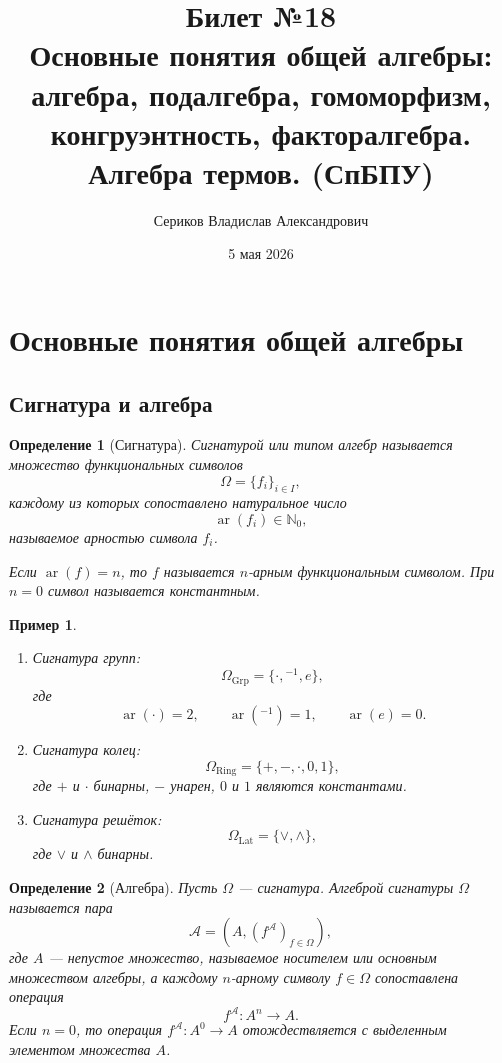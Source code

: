 \documentclass[12pt,a4paper]{article}
\title{Билет №18 \\ \small Основные понятия общей алгебры: алгебра, подалгебра, гомоморфизм, конгруэнтность, факторалгебра. Алгебра термов. (СпБПУ)}
\author{Сериков Владислав Александрович}
\date{5 мая 2026}
\newtheorem{definition}{Определение}
\newtheorem{example}{Пример}
\begin{document}
\maketitle
\tableofcontents
\newpage

\section{Основные понятия общей алгебры}

\subsection{Сигнатура и алгебра}

\begin{definition}[Сигнатура]
\emph{Сигнатурой} или \emph{типом алгебр} называется множество функциональных символов
\[
\Omega=\{f_i\}_{i\in I},
\]
каждому из которых сопоставлено натуральное число
\[
\operatorname{ar}(f_i)\in \mathbb N_0,
\]
называемое \emph{арностью} символа $f_i$.

Если $\operatorname{ar}(f)=n$, то $f$ называется $n$-арным функциональным символом.
При $n=0$ символ называется \emph{константным}.
\end{definition}

\begin{example}
\begin{enumerate}
    \item Сигнатура групп:
    \[
    \Omega_{\mathrm{Grp}}=\{\cdot,{}^{-1},e\},
    \]
    где
    \[
    \operatorname{ar}(\cdot)=2,\qquad
    \operatorname{ar}({}^{-1})=1,\qquad
    \operatorname{ar}(e)=0.
    \]

    \item Сигнатура колец:
    \[
    \Omega_{\mathrm{Ring}}=\{+,-,\cdot,0,1\},
    \]
    где $+$ и $\cdot$ бинарны, $-$ унарен, $0$ и $1$ являются константами.

    \item Сигнатура решёток:
    \[
    \Omega_{\mathrm{Lat}}=\{\vee,\wedge\},
    \]
    где $\vee$ и $\wedge$ бинарны.
\end{enumerate}
\end{example}

\begin{definition}[Алгебра]
Пусть $\Omega$ --- сигнатура. \emph{Алгеброй сигнатуры $\Omega$} называется пара
\[
\mathcal A=(A,(f^{\mathcal A})_{f\in\Omega}),
\]
где $A$ --- непустое множество, называемое \emph{носителем} или \emph{основным множеством} алгебры, а каждому $n$-арному символу $f\in\Omega$ сопоставлена операция
\[
f^{\mathcal A}\colon A^n\to A.
\]
Если $n=0$, то операция $f^{\mathcal A}\colon A^0\to A$ отождествляется с выделенным элементом множества $A$.
\end{definition}
\end{document}
